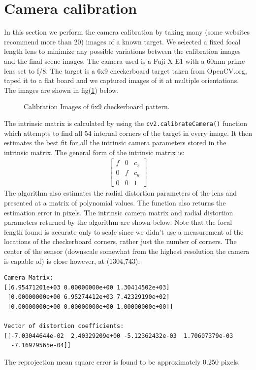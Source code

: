 \documentclass[a4paper]{article}
\begin{document}
\section{Camera calibration}
In this section we perform the camera calibration by taking many (some websites recommend more than 20) images of a known target.  We selected a fixed focal length lens to minimize any possible variations between the calibration images and the final scene images. The camera used is a Fuji X-E1 with a 60mm prime lens set to f/8.  The target is a 6x9 checkerboard target taken from OpenCV.org, taped it to a flat board and we captured images of it at multiple orientations.  The images are shown in fig(\ref{fig:chkbd}) below.
 \begin{figure}[htb!]
    \caption{Calibration Images of 6x9 checkerboard pattern.}
    \label{fig:chkbd}
\end{figure}
\FloatBarrier
The intrinsic matrix is calculated by using the \verb|cv2.calibrateCamera()| function which attempts to find all 54 internal corners of the target in every image.  It then estimates the best fit for all the intrinsic camera parameters stored in the intrinsic matrix.  The general form of the intrinsic matrix is:
\begin{align*}
	\begin{bmatrix}
		f & 0 & c_x\\
		0 & f & c_y\\
		0 & 0 & 1
	\end{bmatrix}
\end{align*}
The algorithm also estimates the radial distortion parameters of the lens and presented at a matrix of polynomial values.  The function also returns the estimation error in pixels.  The  intrinsic camera matrix and radial distortion parameters returned by the algorithm are shown below.  Note that the focal length found is accurate only to scale since we didn't use a measurement of the locations of the checkerboard corners, rather just the number of corners. The center of the sensor (downscale somewhat from the highest resolution the camera is capable of) is close however, at (1304,743).
\begin{verbatim}
Camera Matrix: 
[[6.95471201e+03 0.00000000e+00 1.30414502e+03]
 [0.00000000e+00 6.95274412e+03 7.42329190e+02]
 [0.00000000e+00 0.00000000e+00 1.00000000e+00]]

Vector of distortion coefficients:
[[-7.03044644e-02  2.40329209e+00 -5.12362432e-03  1.70607379e-03
  -7.16979565e-04]]
 \end{verbatim}
 The reprojection mean square error is found to be approximately 0.250 pixels.
\end{document}
